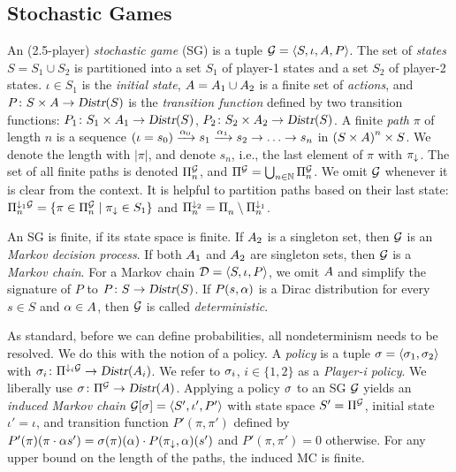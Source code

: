 \subsection{Stochastic Games}
An (2.5-player) \emph{stochastic game} (SG) is a tuple $\sg = \langle S, \iota, \Act, P \rangle$. The set of \emph{states} $S = S_1 \cup S_2$ is partitioned into a set $S_1$ of player-1 states and a set $S_2$ of player-2 states. $\iota \in S_1$ is the \emph{initial state}, $\Act = \Act_1 \cup \Act_2$ is a finite set of \emph{actions}, and $P\colon S \times \Act \rightarrow \Distr(S)$ is the \emph{transition function} defined by two transition functions: $P_1\colon S_1 \times \Act_1 \rightarrow \Distr(S)$, $P_2\colon S_2 \times \Act_2 \rightarrow \Distr(S)$. 
A finite \emph{path} $\pi$ of length $n$ is a sequence $(\iota = s_0 ) \xrightarrow{\act_0} s_1 \xrightarrow{\act_1} s_2 \rightarrow \hdots \rightarrow s_n$ in $\left( S \times \Act \right)^{n} \times S$. We denote the length with $|\pi|$, and denote $s_n$, i.e., the last element of $\pi$ with $\last{\pi}$. The set of all finite paths is denoted $\Paths[n]{\sg}$, and $\Paths{\sg} = \bigcup_{n \in \NN} \Paths[n]{\sg}$. We omit $\sg$ whenever it is clear from the context. It is helpful to partition paths based on their last state: $\POnePaths[n]{\sg} = \{ \pi \in \Paths[n]{\sg} \mid \last{\pi} \in S_1 \}$ and $\PTwoPaths[n]{} = \Paths[n]{} \setminus \POnePaths[n]{}$.

An SG is finite, if its state space is finite.
If $\Act_2$ is a singleton set, then $\sg$ is an \emph{Markov decision process}.
If both $\Act_1$ and $\Act_2$ are singleton sets, then $\sg$ is a \emph{Markov chain}. For a Markov chain $\mc = \langle S, \iota, P \rangle$, we omit $\Act$ and simplify the signature of $P$ to $P\colon S\rightarrow \Distr(S)$.
If $P(s,\act)$ is a Dirac distribution for every $s \in S$ and $\act \in \Act$, then $\sg$ is called \emph{deterministic}.


As standard, before we can define probabilities, all nondeterminism needs to be resolved. We do this with the notion of a policy. A \emph{policy} is a tuple $\sched = \langle \sched_1, \sched_2 \rangle$ with $\sched_i \colon \PiPaths[]{\sg} \rightarrow \Distr(\Act_i)$. We refer to $\sched_i$, $i \in \{ 1, 2 \}$ as a \emph{Player-i policy}. We liberally use $\sched \colon \Paths{\sg} \rightarrow \Distr(\Act)$.
Applying a policy $\sched$ to an SG $\sg$ yields an \emph{induced Markov chain} $\induced{\sg}{\sched} = \langle S', \iota', P' \rangle$ with state space $S' = \Paths{\sg}$, initial state $\iota' = \iota$, and transition function $P'(\pi,\pi')$ defined by $P'(\pi)(\pi \cdot \act s') = \sched(\pi)(\act) \cdot P(\last{\pi},\act)(s')$ and $P'(\pi,\pi') = 0$ otherwise. For any upper bound on the length of the paths, the induced MC is finite. 

